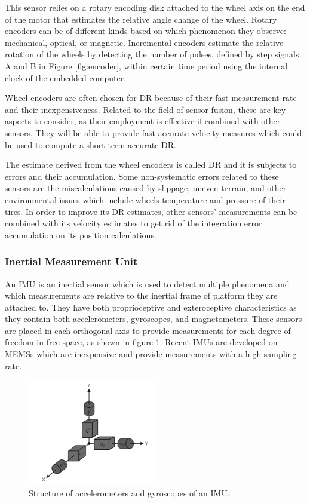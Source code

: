 This sensor relies on a rotary encoding disk attached to the wheel axis on the end of the motor that estimates the relative angle change of the wheel.
Rotary encoders can be of different kinds based on which phenomenon they observe: mechanical, optical, or magnetic.
Incremental encoders estimate the relative rotation of the wheels by detecting the number of pulses, defined by step signals A and B in Figure \ref{fig:encoder}, within certain time period using the internal clock of the embedded computer.

Wheel encoders are often chosen for \gls{DR} because of their fast measurement rate and their inexpensiveness.
Related to the field of sensor fusion, these are key aspects to consider, as their employment is effective if combined with other sensors. They will be able to provide fast accurate velocity measures which could be used to compute a short-term accurate \gls{DR}.

The estimate derived from the wheel encoders is called \gls{DR} and it is subjects to errors and their accumulation.
Some non-systematic errors related to these sensors are the miscalculations caused by slippage, uneven terrain, and other environmental issues which include wheels temperature and pressure of their tires.
In order to improve its \gls{DR} estimates, other sensors' measurements can be combined with its velocity estimates to get rid of the integration error accumulation on its position calculations.


\subsubsection{Inertial Measurement Unit}

\noindent An \gls{IMU} is an inertial sensor which is used to detect multiple phenomena and which measurements are relative to the inertial frame of platform they are attached to.
They have both proprioceptive and exteroceptive characteristics as they contain both accelerometers, gyroscopes, and magnetometers.
These sensors are placed in each orthogonal axis to provide measurements for each degree of freedom in free space, as shown in figure \ref{fig:imu}.
Recent \glspl{IMU} are developed on \glspl{MEMS} which are inexpensive and provide measurements with a high sampling rate.
\begin{figure}[!ht]
  \begin{center}
    \includegraphics[width=0.5\textwidth]{Images/2-Background/IMU-2021-04-23 14-13-19.png}
  \end{center}
  \caption{Structure of accelerometers and gyroscopes of an \Gls{IMU}. \cite{inertial}}
  \label{fig:imu}
\end{figure}

